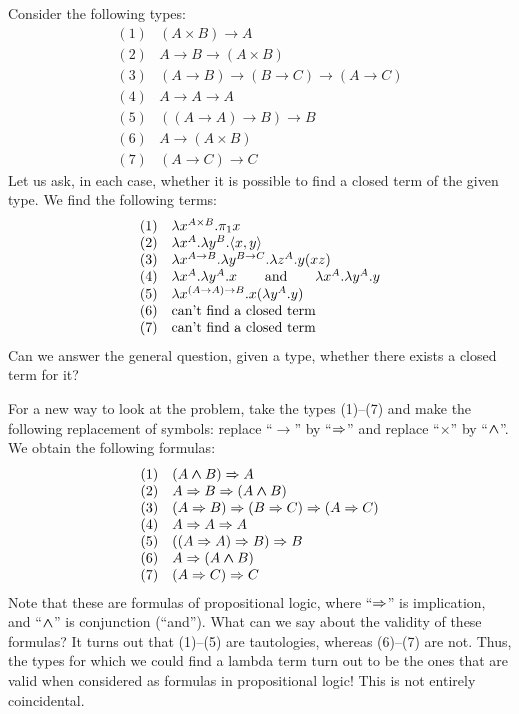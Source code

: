 \documentclass{article}
\begin{document}
Consider the following types:
\[ \begin{array}{ll}
  (1)& (A\times B)\to A \\
  (2)& A\to B\to (A\times B) \\
  (3)& (A\to B)\to(B\to C)\to(A\to C) \\
  (4)& A\to A\to A \\
  (5)& ((A\to A)\to B)\to B \\
  (6)& A\to (A\times B) \\
  (7)& (A\to C)\to C
\end{array}
\]
Let us ask, in each case, whether it is possible to find a closed term
of the given type. We find the following terms:
\[ \begin{array}{ll}
  (1)& \lambda x^{A\times B}.\pi_1 x \\
  (2)& \lambda x^{A}.\lambda y^{B}.\langle x,y\rangle \\
  (3)& \lambda x^{A\to B}.\lambda y^{B\to C}.\lambda z^{A}.y(xz) \\
  (4)& \lambda x^{A}.\lambda y^{A}.x 
  \hspace{2em}\mbox{and}\hspace{2em}
  \lambda x^{A}.\lambda y^{A}.y \\
  (5)& \lambda x^{(A\to A)\to B}.x(\lambda y^{A}.y) \\
  (6)& \mbox{can't find a closed term} \\
  (7)& \mbox{can't find a closed term}
\end{array}
\]
Can we answer the general question, given a type, whether there exists
a closed term for it?

For a new way to look at the problem, take the types (1)--(7) and
make the following replacement of symbols: replace ``$\to$'' by
``$\Rightarrow$'' and replace ``$\times$'' by ``$\mathbin{\textrm{\rm\boldmath $\wedge$}}$''. We obtain the
following formulas:
\[ \begin{array}{ll}
  (1)& (A\mathbin{\textrm{\rm\boldmath $\wedge$}} B)\Rightarrow A \\
  (2)& A\Rightarrow B\Rightarrow (A\mathbin{\textrm{\rm\boldmath $\wedge$}} B) \\
  (3)& (A\Rightarrow B)\Rightarrow(B\Rightarrow C)\Rightarrow(A\Rightarrow C) \\
  (4)& A\Rightarrow A\Rightarrow A \\
  (5)& ((A\Rightarrow A)\Rightarrow B)\Rightarrow B \\
  (6)& A\Rightarrow (A\mathbin{\textrm{\rm\boldmath $\wedge$}} B) \\
  (7)& (A\Rightarrow C)\Rightarrow C
\end{array}
\]
Note that these are formulas of propositional logic, where ``$\Rightarrow$''
is implication, and ``$\mathbin{\textrm{\rm\boldmath $\wedge$}}$'' is conjunction (``and''). What can we
say about the validity of these formulas? It turns out that (1)--(5)
are tautologies, whereas (6)--(7) are not. Thus, the types for which we
could find a lambda term turn out to be the ones that are valid
when considered as formulas in propositional logic! This is not
entirely coincidental.
\end{document}
